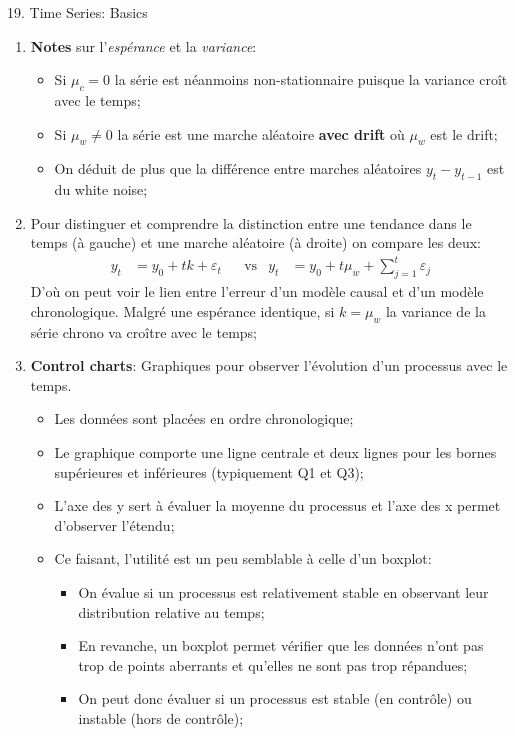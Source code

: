 \documentclass[12pt, titlepage, french]{report}
\begin{document}
\begin{CHPT_SUMM}[label = {timeseries19}]{19. Time Series: Basics}
\begin{enumerate}
%		
	\item[]	\textbf{Notes} sur l'\textit{espérance} et la \textit{variance}:
		\begin{itemize}
		\item	Si $\mu_{c} = 0$ la série est néanmoins non-stationnaire puisque la variance croît avec le temps;
		\item	Si $\mu_{w} \neq 0$ la série est une marche aléatoire \textbf{avec drift} où $\mu_{w}$ est le drift;
		\item	On déduit de plus que la différence entre marches aléatoires $y_{t} - y_{t - 1}$ est du white noise;
		\end{itemize}
	\item[]	Pour distinguer et comprendre la distinction entre une tendance dans le temps (à gauche) et une marche aléatoire (à droite) on compare les deux:
	\begin{align*}
		y_{t}	&= 	y_{0} + t k + \varepsilon_{t}	&
		&\text{vs}	&
		y_{t}	&= 	y_{0} + t \mu_{w}  + \sum_{j = 1}^{t} \varepsilon_{j}	
	\end{align*}
	D'où on peut voir le lien entre l'erreur d'un modèle causal et d'un modèle chronologique. Malgré une espérance identique, si $k = \mu_{w}$ la variance de la série chrono va croître avec le temps;
	\item	\textbf{Control charts}: Graphiques pour observer l'évolution d'un processus avec le temps.
		\begin{itemize}
		\item	Les données sont placées en ordre chronologique;
		\item	Le graphique comporte une ligne centrale et deux lignes pour les bornes supérieures et inférieures (typiquement Q1 et Q3);
		\item	L'axe des y sert à évaluer la moyenne du processus et l'axe des x permet d'observer l'étendu;
		\item	Ce faisant, l'utilité est un peu semblable à celle d'un boxplot:
			\begin{itemize}
			\item	On évalue si un processus est relativement stable en observant leur distribution relative au temps;
			\item	En revanche, un boxplot permet vérifier que les données n'ont pas trop de points aberrants et qu’elles ne sont pas trop répandues;
			\item	On peut donc évaluer si un processus est stable (en contrôle) ou instable (hors de contrôle);
			\end{itemize}

\end{itemize}
\end{enumerate}
\end{CHPT_SUMM}
\end{document}
